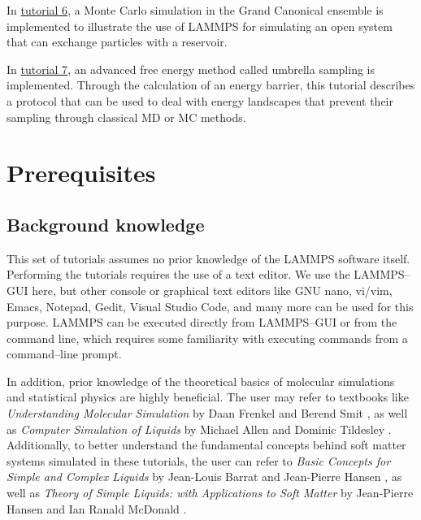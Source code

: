 \documentclass[9pt,tutorial]{livecoms}
\begin{document}
In \hyperref[gcmc-silica-label]{tutorial 6}, a Monte Carlo simulation in
the Grand Canonical ensemble is implemented to illustrate the use of
LAMMPS for simulating an open system that can exchange particles with a
reservoir.

In \hyperref[umbrella-sampling-label]{tutorial 7}, an advanced free
energy method called umbrella sampling is implemented.  Through the
calculation of an energy barrier, this tutorial describes a protocol
that can be used to deal with energy landscapes that prevent their
sampling through classical MD or MC methods.


\section{Prerequisites}


\subsection{Background knowledge}

This set of tutorials assumes no prior knowledge of the LAMMPS software
itself.  Performing the tutorials requires the use of a text editor.  We
use the LAMMPS--GUI \cite{lammps_gui_docs} here, but other console or
graphical text editors like GNU nano, vi/vim, Emacs, Notepad, Gedit,
Visual Studio Code, and many more can be used for this purpose.  LAMMPS
can be executed directly from LAMMPS--GUI or from the command line,
which requires some familiarity with executing commands from a
command--line prompt.

In addition, prior knowledge of the theoretical basics of molecular
simulations and statistical physics are highly beneficial.  The user may
refer to textbooks like \textit{Understanding Molecular Simulation} by
Daan Frenkel and Berend Smit \cite{frenkel2023understanding}, as well as
\textit{Computer Simulation of Liquids} by Michael Allen and Dominic
Tildesley \cite{allen2017computer}.  Additionally, to better understand
the fundamental concepts behind soft matter systems simulated in these
tutorials, the user can refer to \textit{Basic Concepts for Simple and
  Complex Liquids} by Jean-Louis Barrat and Jean-Pierre Hansen
\cite{barrat2003basic}, as well as \textit{Theory of Simple Liquids:
  with Applications to Soft Matter} by Jean-Pierre Hansen and Ian Ranald
McDonald \cite{hansen2013theory}.
\end{document}
